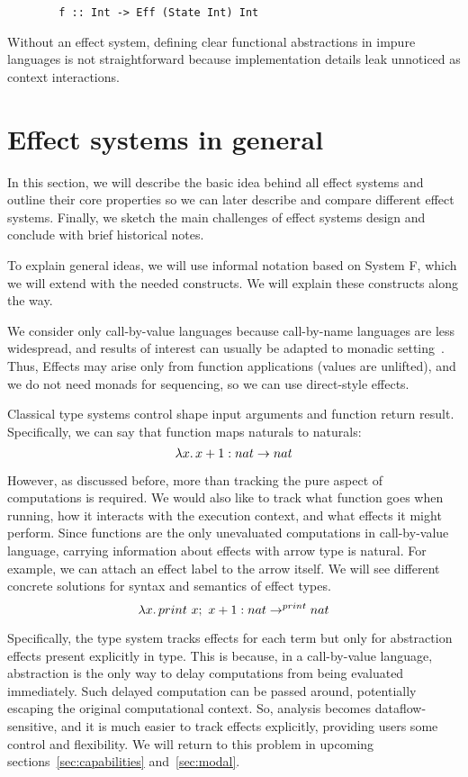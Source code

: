 \documentclass[conference]{IEEEtran}
\newcommand{\seq}{;~}
\newcommand{\ap}{~}
\begin{document}
    \begin{verbatim}
        f :: Int -> Eff (State Int) Int
    \end{verbatim}

    Without an effect system, defining clear functional abstractions in impure languages is not straightforward because implementation details leak unnoticed as context interactions.


    \section{Effect systems in general}

    In this section, we will describe the basic idea behind all effect systems and outline their core properties so we can later describe and compare different effect systems.
    Finally, we sketch the main challenges of effect systems design and conclude with brief historical notes.

    To explain general ideas, we will use informal notation based on System F, which we will extend with the needed constructs.
    We will explain these constructs along the way.

    We consider only call-by-value languages because call-by-name languages are less widespread, and results of interest can usually be adapted to monadic setting~\cite{wadler2003marriage}.
    Thus, Effects may arise only from function applications (values are unlifted), and we do not need monads for sequencing, so we can use direct-style effects.

    Classical type systems control shape input arguments and function return result.
    Specifically, we can say that function maps naturals to naturals:
    \[\lambda x\ldotp x + 1 : nat\to nat\]

    However, as discussed before, more than tracking the pure aspect of computations is required.
    We would also like to track what function goes when running, how it interacts with the execution context, and what effects it might perform.
    Since functions are the only unevaluated computations in call-by-value language, carrying information about effects with arrow type is natural.
    For example, we can attach an effect label to the arrow itself.
    We will see different concrete solutions for syntax and semantics of effect types.
    \[\lambda x\ldotp print \ap x\seq x + 1 : nat\to^{print} nat\]

    Specifically, the type system tracks effects for each term but only for abstraction effects present explicitly in type.
    This is because, in a call-by-value language, abstraction is the only way to delay computations from being evaluated immediately.
    Such delayed computation can be passed around, potentially escaping the original computational context.
    So, analysis becomes dataflow-sensitive, and it is much easier to track effects explicitly, providing users some control and flexibility.
    We will return to this problem in upcoming sections~\ref{sec:capabilities} and~\ref{sec:modal}.
\end{document}
